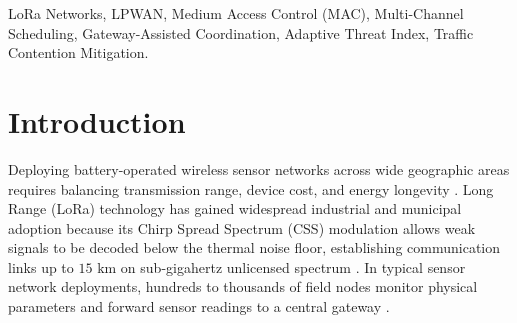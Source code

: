 \documentclass[preprint,review,12pt]{elsarticle}
\begin{document}
\begin{frontmatter}
\begin{abstract}
Across the two-million-event evaluation, adding RIACC to Pure ALOHA increases the Packet Delivery Ratio (PDR) from $3.60\%$ to $9.32\%$, improves emergency message delivery from $0.19\%$ to $12.07\%$, lowers the channel collision rate from $96.40\%$ to $46.51\%$, and reduces transceiver electrical energy consumed per delivered packet from $171,161\text{ mJ}$ to $40,017\text{ mJ}$ ($76.62\%$ reduction). For the Class A baseline, RIACC increases overall PDR from $6.62\%$ to $38.04\%$, raises emergency alert delivery from $0.38\%$ to $54.74\%$, reduces the channel collision rate from $93.38\%$ to $38.40\%$ (preventing $1,099,625$ packet collisions), and lowers energy consumption per delivered packet by $77.95\%$ (from $27,170\text{ mJ}$ to $5,991\text{ mJ}$). These empirical findings demonstrate that RIACC effectively mitigates channel contention, safeguards critical emergency telemetry, and improves energy efficiency in dense LPWAN deployments.
\end{abstract}

\begin{keywords}
LoRa Networks, LPWAN, Medium Access Control (MAC), Multi-Channel Scheduling, Gateway-Assisted Coordination, Adaptive Threat Index, Traffic Contention Mitigation.
\end{keywords}

\end{frontmatter}




\section{Introduction}

\label{sec:introduction}

Deploying battery-operated wireless sensor networks across wide geographic areas requires balancing transmission range, device cost, and energy longevity \cite{augustin2016study}. Long Range (LoRa) technology has gained widespread industrial and municipal adoption because its Chirp Spread Spectrum (CSS) modulation allows weak signals to be decoded below the thermal noise floor, establishing communication links up to $15\text{ km}$ on sub-gigahertz unlicensed spectrum \cite{adelantado2017understanding, centenaro2016long}. In typical sensor network deployments, hundreds to thousands of field nodes monitor physical parameters and forward sensor readings to a central gateway \cite{georgiou2017low}.
\end{document}
